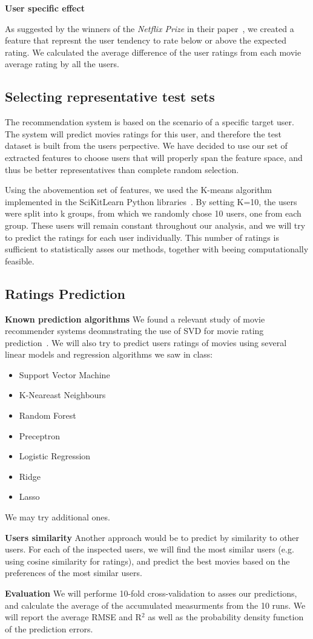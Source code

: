 \textbf{User specific effect}

As suggested by the winners of the \textit{Netflix Prize} in their paper~\cite{bell2007bellkor}, we created a feature that represnt the user tendency to rate below or above the expected rating. We calculated the average difference of the user ratings from each movie average rating by all the users.

\subsection{Selecting representative test sets}
The recommendation system is based on the scenario of a specific target user. The system will predict movies ratings for this user, and therefore the test dataset is built from the users perpective. We have decided to use our set of extracted features to choose users that will properly span the feature space, and thus be better representatives than complete random selection. 

Using the abovemention set of features, we used the K-means algorithm implemented in the SciKitLearn Python libraries~\cite{pedregosa2011scikit}. By setting K=10, the users were split into k groups, from which we randomly chose 10 users, one from each group. These users will remain constant throughout our analysis, and we will try to predict the ratings for each user individually. This number of ratings is sufficient to statistically asses our methods, together with beeing computationally feasible.

\subsection{Ratings Prediction}
\textbf{Known prediction algorithms}
We found a relevant study of movie recommender systems deomnstrating the use of SVD for movie rating prediction~\cite{Ekstrand:2011:RRR:2043932.2043958}.
We will also try to predict users ratings of movies using several linear models and regression algorithms we saw in class:
\begin{itemize}
\item Support Vector Machine
\item K-Neareast Neighbours
\item Random Forest
\item Preceptron
\item Logistic Regression
\item Ridge
\item Lasso
\end{itemize}
We may try additional ones.

\textbf{Users similarity}
Another approach would be to predict by similarity to other users. For each of the inspected users, we will find the most similar users (e.g. using cosine similarity for ratings), and predict the best movies based on the preferences of the most similar users.

\textbf{Evaluation}
We will performe 10-fold cross-validation to asses our predictions, and calculate the average of the accumulated measurments from the 10 runs. We will report the average RMSE and R$^2$ as well as the probability density function of the prediction errors.

